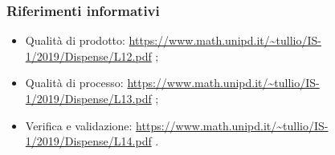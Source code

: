 \subsubsection{Riferimenti informativi}
\begin{itemize}

\item Qualità di prodotto: \url{https://www.math.unipd.it/~tullio/IS-1/2019/Dispense/L12.pdf} ;

\item Qualità di processo: \url{https://www.math.unipd.it/~tullio/IS-1/2019/Dispense/L13.pdf} ;

\item Verifica e validazione: \url{https://www.math.unipd.it/~tullio/IS-1/2019/Dispense/L14.pdf} .

\end{itemize}
